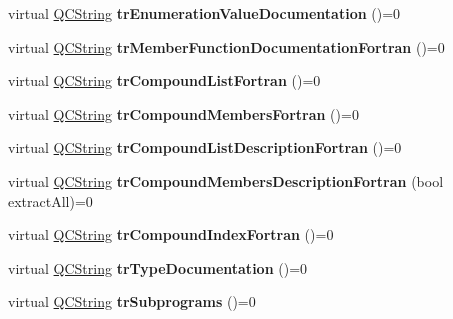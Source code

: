 \begin{DoxyCompactItemize}
\item 
\mbox{\label{class_translator_aea7d68b2384a8a88eaa88638e1af2d51}} 
virtual \mbox{\hyperlink{class_q_c_string}{Q\+C\+String}} {\bfseries tr\+Enumeration\+Value\+Documentation} ()=0
\item 
\mbox{\label{class_translator_a0b6cc2ce49b7b1587e958fd537bf2f22}} 
virtual \mbox{\hyperlink{class_q_c_string}{Q\+C\+String}} {\bfseries tr\+Member\+Function\+Documentation\+Fortran} ()=0
\item 
\mbox{\label{class_translator_aa63e646006549a0504783bcb9049a5c0}} 
virtual \mbox{\hyperlink{class_q_c_string}{Q\+C\+String}} {\bfseries tr\+Compound\+List\+Fortran} ()=0
\item 
\mbox{\label{class_translator_aef130f6aef47d68ad82b30299a8f704f}} 
virtual \mbox{\hyperlink{class_q_c_string}{Q\+C\+String}} {\bfseries tr\+Compound\+Members\+Fortran} ()=0
\item 
\mbox{\label{class_translator_aee8fb1ec3c97865efe420ed67ca49c58}} 
virtual \mbox{\hyperlink{class_q_c_string}{Q\+C\+String}} {\bfseries tr\+Compound\+List\+Description\+Fortran} ()=0
\item 
\mbox{\label{class_translator_af9d5b1d1ff55debe8079331a2e32ea4a}} 
virtual \mbox{\hyperlink{class_q_c_string}{Q\+C\+String}} {\bfseries tr\+Compound\+Members\+Description\+Fortran} (bool extract\+All)=0
\item 
\mbox{\label{class_translator_ab704a3dfea30bf2f98e1d2b568027ecd}} 
virtual \mbox{\hyperlink{class_q_c_string}{Q\+C\+String}} {\bfseries tr\+Compound\+Index\+Fortran} ()=0
\item 
\mbox{\label{class_translator_a96a7cdf0b35d6c092875b364bac5f2cf}} 
virtual \mbox{\hyperlink{class_q_c_string}{Q\+C\+String}} {\bfseries tr\+Type\+Documentation} ()=0
\item 
\mbox{\label{class_translator_ad8bee4c72ece7c603742a06d2e097bb2}} 
virtual \mbox{\hyperlink{class_q_c_string}{Q\+C\+String}} {\bfseries tr\+Subprograms} ()=0
\item 

\end{DoxyCompactItemize}

